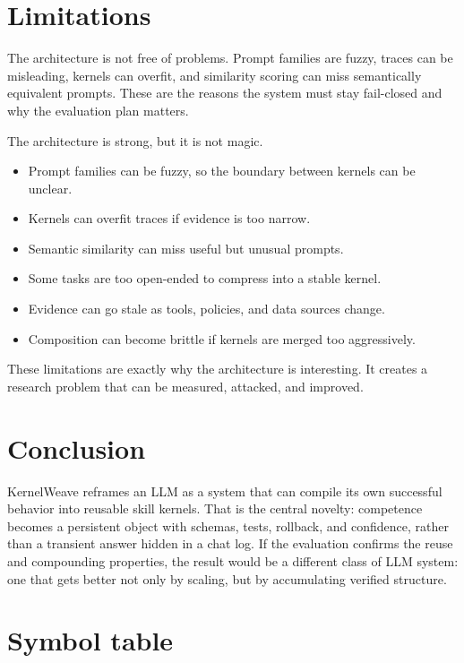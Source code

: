 \documentclass{article}
\begin{document}
\appendix

\section{Limitations}

The architecture is not free of problems. Prompt families are fuzzy, traces can be misleading, kernels can overfit, and similarity scoring can miss semantically equivalent prompts. These are the reasons the system must stay fail-closed and why the evaluation plan matters.

The architecture is strong, but it is not magic.

\begin{itemize}[leftmargin=1.2em]
\item Prompt families can be fuzzy, so the boundary between kernels can be unclear.
\item Kernels can overfit traces if evidence is too narrow.
\item Semantic similarity can miss useful but unusual prompts.
\item Some tasks are too open-ended to compress into a stable kernel.
\item Evidence can go stale as tools, policies, and data sources change.
\item Composition can become brittle if kernels are merged too aggressively.
\end{itemize}

These limitations are exactly why the architecture is interesting. It creates a research problem that can be measured, attacked, and improved.

\section{Conclusion}

KernelWeave reframes an LLM as a system that can compile its own successful behavior into reusable skill kernels. That is the central novelty: competence becomes a persistent object with schemas, tests, rollback, and confidence, rather than a transient answer hidden in a chat log. If the evaluation confirms the reuse and compounding properties, the result would be a different class of LLM system: one that gets better not only by scaling, but by accumulating verified structure.

\section{Symbol table}
\end{document}
